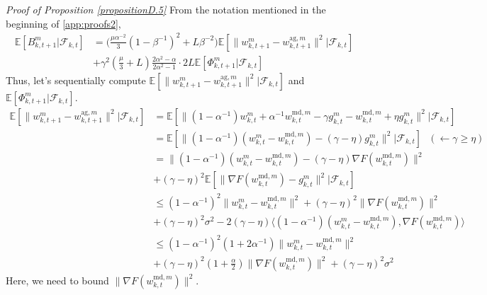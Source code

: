 \documentclass[11pt]{article}
\begin{document}
\emph{Proof of Proposition \ref{propositionD.5}}
\textrm{ } From the notation mentioned in the beginning of \cref{app:proofs2},
\begin{align} \label{eqD.5-1}
    \mathbb{E}[B_{k, t+1}^m|\mathcal{F}_{k, t}] &= \Big( \frac{\mu\alpha^{-2}}{3}(1-\beta^{-1})^2 + L\beta^{-2}\Big)\mathbb{E}[\|w_{k, t+1}^m - w_{k, t+1}^{\textrm{ag}, m}\|^2|\mathcal{F}_{k, t}] \nonumber\\
    &+ \gamma^2(\frac{\mu}{3} + L)\frac{2\alpha^2-\alpha}{2\alpha^2-1}\cdot 2L\mathbb{E}[\Phi_{k, t+1}^m|\mathcal{F}_{k, t}]
\end{align}
Thus, let's sequentially compute $\mathbb{E}[\|w_{k, t+1}^m - w_{k, t+1}^{\textrm{ag}, m}\|^2|\mathcal{F}_{k, t}]$ and $\mathbb{E}[\Phi_{k, t+1}^m|\mathcal{F}_{k, t}]$.
\begin{align*}
    \mathbb{E}[\|w_{k, t+1}^m - w_{k, t+1}^{\textrm{ag}, m}\|^2|\mathcal{F}_{k, t}] &= \mathbb{E}[\|(1-\alpha^{-1})w_{k, t}^m + \alpha^{-1}w_{k, t}^{\textrm{md}, m} - \gamma g_{k, t}^m - w_{k, t}^{\textrm{md}, m} + \eta g_{k, t}^m\|^2|\mathcal{F}_{k, t}] \\
    &= \mathbb{E}[\|(1-\alpha^{-1})(w_{k, t}^m - w_{k, t}^{\textrm{md}, m}) - (\gamma-\eta)g_{k, t}^m\|^2|\mathcal{F}_{k, t}] \textrm{ } (\leftarrow \gamma \geq \eta) \\
    &= \|(1-\alpha^{-1})(w_{k, t}^m - w_{k, t}^{\textrm{md}, m}) - (\gamma-\eta)\nabla F(w_{k, t}^{\textrm{md}, m})\|^2 \\
    &+ (\gamma - \eta)^2\mathbb{E}[\|\nabla F(w_{k, t}^{\textrm{md}, m}) - g_{k, t}^m\|^2|\mathcal{F}_{k, t}] \\
    &\leq (1-\alpha^{-1})^2 \|w_{k, t}^m - w_{k, t}^{\textrm{md}, m}\|^2 + (\gamma-\eta)^2 \|\nabla F(w_{k, t}^{\textrm{md}, m})\|^2 \\
    &+ (\gamma-\eta)^2 \sigma^2 - 2(\gamma-\eta) \langle (1-\alpha^{-1})(w_{k, t}^m - w_{k, t}^{\textrm{md}, m}), \nabla F(w_{k, t}^{\textrm{md}, m})\rangle \\
    &\leq (1-\alpha^{-1})^2(1+2\alpha^{-1}) \|w_{k, t}^m - w_{k, t}^{\textrm{md}, m}\|^2 \\
    &+ (\gamma-\eta)^2(1+\frac{\alpha}{2}) \|\nabla F(w_{k, t}^{\textrm{md}, m})\|^2 + (\gamma-\eta)^2 \sigma^2
\end{align*}
Here, we need to bound $\|\nabla F(w_{k, t}^{\textrm{md}, m})\|^2$.
\end{document}
